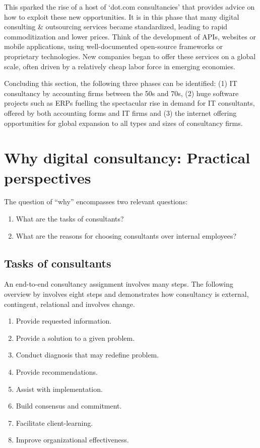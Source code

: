 \documentclass[12pt]{article}
\providecommand{\tightlist}{%
  \setlength{\itemsep}{0pt}\setlength{\parskip}{0pt}}
\begin{document}
This sparked the rise of a host of `dot.com consultancies' that provides
advice on how to exploit these new opportunities. It is in this phase
that many digital consulting \& outsourcing services became
standardized, leading to rapid commoditization and lower prices. Think
of the development of APIs, websites or mobile applications, using
well-documented open-source frameworks or proprietary technologies. New
companies began to offer these services on a global scale, often driven
by a relatively cheap labor force in emerging economies.

Concluding this section, the following three phases can be identified:
(1) IT consultancy by accounting firms between the 50s and 70s, (2) huge
software projects such as ERPs fuelling the spectacular rise in demand
for IT consultants, offered by both accounting forms and IT firms and
(3) the internet offering opportunities for global expansion to all
types and sizes of consultancy firms.

\section{Why digital consultancy: Practical
perspectives}\label{why-digital-consultancy-practical-perspectives}

The question of ``why'' encompasses two relevant questions:

\begin{enumerate}
\def\labelenumi{\arabic{enumi}.}
\tightlist
\item
  What are the tasks of consultants?
\item
  What are the reasons for choosing consultants over internal employees?
\end{enumerate}

\subsection{Tasks of consultants}\label{tasks-of-consultants}

An end-to-end consultancy assignment involves many steps. The following
overview by \citet{turner1982} involves eight steps and demonstrates how
consultancy is external, contingent, relational and involves change.

\begin{enumerate}
\def\labelenumi{\arabic{enumi}.}
\tightlist
\item
  Provide requested information.
\item
  Provide a solution to a given problem.
\item
  Conduct diagnosis that may redefine problem.
\item
  Provide recommendations.
\item
  Assist with implementation.
\item
  Build consensus and commitment.
\item
  Facilitate client-learning.
\item
  Improve organizational effectiveness.
\end{enumerate}
\end{document}
